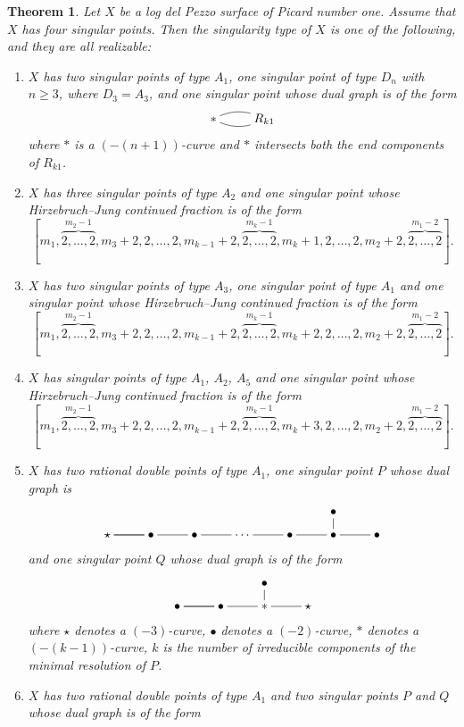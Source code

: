 \documentclass[10pt,oneside,reqno]{amsart}
\newtheorem{theorem}{Theorem}[section]
\theoremstyle{definition}
\theoremstyle{remark}
\numberwithin{equation}{section}
\begin{document}
\begin{theorem}
\label{MainT} Let $X$ be a log del Pezzo surface of Picard number one. Assume that $X$ has four singular points. Then the singularity type of $X$ is one of the following, and they are all realizable:
\begin{enumerate}
\item $X$ has two singular points of type $A_1$, one singular point of type $D_n$ with $n\geq 3$, where $D_3=A_3$, and one singular point whose dual graph is of the form $$\xymatrix@R=0.8em{
\ast \ar@{-}@/^/[r]\ar@{-}@/_/[r] & R_{k1}
}$$
where $\ast$ is a $(-(n+1))$-curve and $\ast$ intersects both the end components of $R_{k1}$.
\item $X$ has three singular points of type $A_2$ and one singular point whose Hirzebruch--Jung continued fraction is of the form
$$[m_1,\overbrace{2,\ldots,2}^{m_2-1},m_3+2,2,\ldots,2,m_{k-1}+2,\overbrace{2,\ldots,2}^{m_k-1},m_k+1,2,\ldots,2,m_2+2,\overbrace{2,\ldots,2}^{m_1-2}].$$
\item $X$ has two singular points of type $A_3$, one singular point of type $A_1$ and one singular point whose Hirzebruch--Jung continued fraction is of the form  $$[m_1,\overbrace{2,\ldots,2}^{m_2-1},m_3+2,2,\ldots,2,m_{k-1}+2,\overbrace{2,\ldots,2}^{m_k-1},m_k+2,2,\ldots,2,m_2+2,\overbrace{2,\ldots,2}^{m_1-2}].$$
\item $X$ has singular points of type $A_1$, $A_2$, $A_5$ and one singular point whose Hirzebruch--Jung continued fraction is of the form
$$[m_1,\overbrace{2,\ldots,2}^{m_2-1},m_3+2,2,\ldots,2,m_{k-1}+2,\overbrace{2,\ldots,2}^{m_k-1},m_k+3,2,\ldots,2,m_2+2,\overbrace{2,\ldots,2}^{m_1-2}].$$
\item $X$ has two rational double points of type $A_1$, one singular point $P$ whose dual graph  is
$$\xymatrix@R=0.8em{
&&&&&\bullet\\
\star\ar@{-}[r]\ar@{-}[r]&\bullet\ar@{-}[r]&\bullet\ar@{-}[r]&\cdots\ar@{-}[r]&\bullet\ar@{-}[r]&\bullet\ar@{-}[r]\ar@{-}[u]&\bullet
}$$
and one singular point $Q$ whose dual graph  is of the form
$$
\xymatrix@R=0.8em{
&&\bullet\\
\bullet\ar@{-}[r]\ar@{-}[r]&\bullet\ar@{-}[r]&\ast\ar@{-}[r]\ar@{-}[u]&\star
}
$$ where $\star$ denotes a $(-3)$-curve, $\bullet$ denotes a $(-2)$-curve, $\ast$ denotes a $(-(k-1))$-curve, $k$ is the number of irreducible components of the minimal resolution of $P$.
\item $X$ has two rational double points of type $A_1$ and two singular points $P$ and $Q$ whose dual graph  is of the form

\end{enumerate}
\end{theorem}
\end{document}

